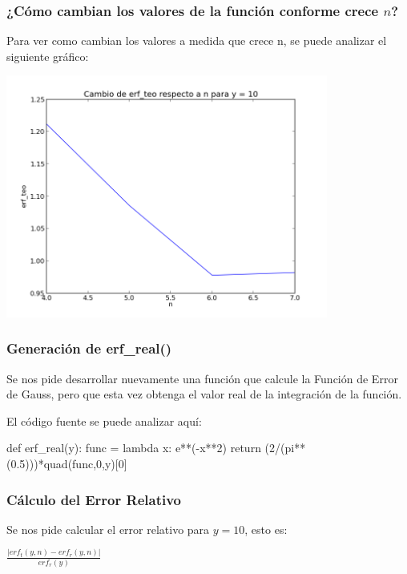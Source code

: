 \documentclass[12pt,letterpaper]{article}
\begin{document}
\subsubsection{¿Cómo cambian los valores de la función conforme crece $n$?}
Para ver como cambian los valores a medida que crece n, se puede analizar el siguiente gráfico:

\includegraphics[width=400px]{preg4.png}

\subsubsection{Generación de erf\_real()}
Se nos pide desarrollar nuevamente una función que calcule la Función de Error de Gauss, pero que esta vez obtenga el valor real de la integración de la función.

El código fuente se puede analizar aquí:
\begin{verbatimtab}[4]
def erf_real(y):
	func = lambda x: e**(-x**2)
	return (2/(pi**(0.5)))*quad(func,0,y)[0]
\end{verbatimtab}

\subsubsection{Cálculo del Error Relativo}
Se nos pide calcular el error relativo para $y=10$, esto es:
\begin{center}
$\frac{|erf_t(y,n) - erf_r(y,n)|}{erf_r(y)}$
\end{center}
\end{document}
